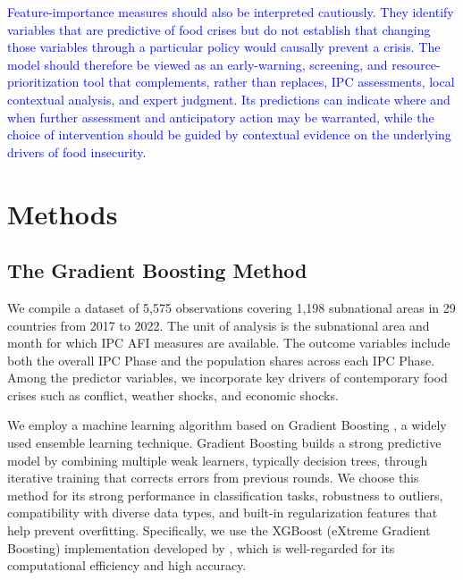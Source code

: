 \documentclass[pdflatex,sn-mathphys-num]{sn-jnl}%
\theoremstyle{thmstyleone}%
\theoremstyle{thmstyletwo}%
\theoremstyle{thmstylethree}%
\begin{document}
\textcolor{blue}{Feature-importance measures should also be interpreted cautiously. They identify variables that are predictive of food crises but do not establish that changing those variables through a particular policy would causally prevent a crisis. The model should therefore be viewed as an early-warning, screening, and resource-prioritization tool that complements, rather than replaces, IPC assessments, local contextual analysis, and expert judgment. Its predictions can indicate where and when further assessment and anticipatory action may be warranted, while the choice of intervention should be guided by contextual evidence on the underlying drivers of food insecurity.}




\section*{Methods}

\subsection*{The Gradient Boosting Method}

We compile a dataset of 5,575 observations covering 1,198 subnational areas in 29 countries from 2017 to 2022. The unit of analysis is the subnational area and month for which IPC AFI measures are available. The outcome variables include both the overall IPC Phase and the population shares across each IPC Phase. Among the predictor variables, we incorporate key drivers of contemporary food crises such as conflict, weather shocks, and economic shocks.

We employ a machine learning algorithm based on Gradient Boosting \citep{friedman2001greedy}, a widely used ensemble learning technique. Gradient Boosting builds a strong predictive model by combining multiple weak learners, typically decision trees, through iterative training that corrects errors from previous rounds. We choose this method for its strong performance in classification tasks, robustness to outliers, compatibility with diverse data types, and built-in regularization features that help prevent overfitting. Specifically, we use the XGBoost (eXtreme Gradient Boosting) implementation developed by \citep{chen2016xgboost}, which is well-regarded for its computational efficiency and high accuracy.
\end{document}
